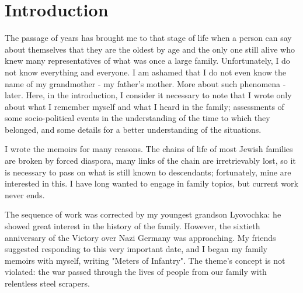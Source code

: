 \chapter{Introduction}
\label{1-1}The passage of years has brought me to that stage of life when a person can say about themselves that they are the oldest by age and the only one still alive who knew many representatives of what was once a large family. Unfortunately, I do not know everything and everyone. I am ashamed that I do not even know the name of my grandmother - my father's mother. More about such phenomena - later. Here, in the introduction, I consider it necessary to note that I wrote only about what I remember myself and what I heard in the family; assessments of some socio-political events in the understanding of the time to which they belonged, and some details for a better understanding of the situations.

\label{1-2}I wrote the memoirs for many reasons. The chains of life of most Jewish families are broken by forced diaspora, many links of the chain are irretrievably lost, so it is necessary to pass on what is still known to descendants; fortunately, mine are interested in this. I have long wanted to engage in family topics, but current work never ends.

\label{2-1}The sequence of work was corrected by my youngest grandson Lyovochka: he showed great interest in the history of the family. However, the sixtieth anniversary of the Victory over Nazi Germany was approaching. My friends suggested responding to this very important date, and I began my family memoirs with myself, writing "Meters of Infantry". The theme's concept is not violated: the war passed through the lives of people from our family with relentless steel scrapers.
